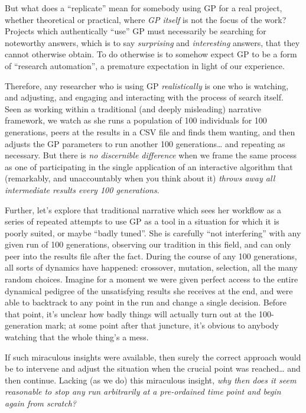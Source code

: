 But what does a ``replicate'' mean for somebody using GP for a real project, whether theoretical or practical, where \emph{GP itself} is not the focus of the work? Projects which authentically ``use'' GP must necessarily be searching for noteworthy answers, which is to say \emph{surprising} and \emph{interesting} answers, that they cannot otherwise obtain. To do otherwise is to somehow expect GP to be a form of ``research automation'', a premature expectation in light of our experience.

Therefore, any researcher who is using GP \emph{realistically} is one who is watching, and adjusting, and engaging and interacting with the process of search itself. Seen as working within a traditional (and deeply misleading) narrative framework, we watch as she runs a population of 100 individuals for 100 generations, peers at the results in a CSV file and finds them wanting, and then adjusts the GP parameters to run another 100 generations\ldots{} and repeating as necessary. But there is \emph{no discernible difference} when we frame the same process as one of participating in the single application of an interactive algorithm that (remarkably, and unaccountably when you think about it) \emph{throws away all intermediate results every 100 generations}.

Further, let's explore that traditional narrative which sees her workflow as a series of repeated attempts to use GP as a tool in a situation for which it is poorly suited, or maybe ``badly tuned''. She is carefully ``not interfering'' with any given run of 100 generations, observing our tradition in this field, and can only peer into the results file after the fact. During the course of any 100 generations, all sorts of dynamics have happened: crossover, mutation, selection, all the many random choices. Imagine for a moment we were given perfect access to the entire dynamical pedigree of the unsatisfying results she receives at the end, and were able to backtrack to any point in the run and change a single decision. Before that point, it's unclear how badly things will actually turn out at the 100-generation mark; at some point after that juncture, it's obvious to anybody watching that the whole thing's a mess.

If such miraculous insights were available, then surely the correct approach would be to intervene and adjust the situation when the crucial point was reached\ldots{} and then continue. Lacking (as we do) this miraculous insight, \emph{why then does it seem reasonable to stop any run arbitrarily at a pre-ordained time point and begin again from scratch?}

